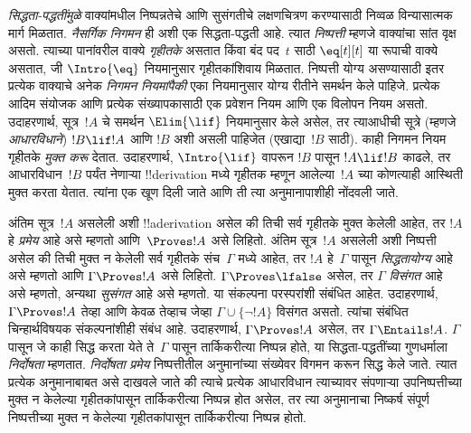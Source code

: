 \emph{सिद्धता-पद्धतींमुळे} वाक्यांमधील निष्पन्नतेचे आणि सुसंगतीचे लक्षणचित्रण करण्यासाठी निव्वळ विन्यासात्मक मार्ग मिळतात. \emph{नैसर्गिक निगमन} ही अशी एक सिद्धता-पद्धती आहे. त्यात \emph{निष्पत्ती} म्हणजे वाक्यांचा सांत वृक्ष असतो. त्याच्या पानांवरील वाक्ये \emph{गृहीतके} असतात किंवा बंद पद~$t$ साठी $\eq[t][t]$ या रूपाची वाक्ये असतात, जी $\Intro{\eq}$ नियमानुसार गृहीतकांशिवाय मिळतात. निष्पत्ती योग्य असण्यासाठी इतर प्रत्येक वाक्याचे अनेक \emph{निगमन नियमांपैकी} एका नियमानुसार योग्य रीतीने समर्थन केले पाहिजे. प्रत्येक आदिम संयोजक आणि प्रत्येक संख्यापकासाठी एक प्रवेशन नियम आणि एक विलोपन नियम असतो. उदाहरणार्थ, सूत्र~$!A$ चे समर्थन $\Elim{\lif}$ नियमानुसार केले असेल, तर त्याआधीची सूत्रे (म्हणजे \emph{आधारविधाने}) $!B \lif !A$ आणि $!B$ अशी असली पाहिजेत (एखाद्या~$!B$ साठी). काही निगमन नियम गृहीतके \emph{मुक्त करू} देतात. उदाहरणार्थ, $\Intro{\lif}$ वापरून $!B$ पासून $!A \lif !B$ काढले, तर आधारविधान~$!B$ पर्यंत नेणाऱ्या !!{derivation} मध्ये गृहीतक म्हणून आलेल्या~$!A$ च्या कोणत्याही आस्थिती मुक्त करता येतात. त्यांना एक खूण दिली जाते आणि ती त्या अनुमानापाशीही नोंदवली जाते.

अंतिम सूत्र~$!A$ असलेली अशी !!a{derivation} असेल की तिची सर्व गृहीतके मुक्त केलेली आहेत, तर $!A$ हे \emph{प्रमेय} आहे असे म्हणतो आणि~$\Proves !A$ असे लिहितो. अंतिम सूत्र~$!A$ असलेली अशी निष्पत्ती असेल की तिची मुक्त न केलेली सर्व गृहीतके संच~$\Gamma$ मध्ये आहेत, तर $!A$ हे~$\Gamma$ पासून \emph{सिद्धतायोग्य} आहे असे म्हणतो आणि $\Gamma \Proves !A$ असे लिहितो. $\Gamma \Proves \lfalse$ असेल, तर $\Gamma$ \emph{विसंगत} आहे असे म्हणतो, अन्यथा \emph{सुसंगत} आहे असे म्हणतो. या संकल्पना परस्परांशी संबंधित आहेत. उदाहरणार्थ, $\Gamma \Proves !A$ तेव्हा आणि केवळ तेव्हाच जेव्हा $\Gamma \cup \{\lnot !A\}$ विसंगत असतो. त्यांचा संबंधित चिन्हार्थविषयक संकल्पनांशीही संबंध आहे. उदाहरणार्थ, $\Gamma \Proves !A$ असेल, तर $\Gamma \Entails !A$. $\Gamma$ पासून जे काही सिद्ध करता येते ते~$\Gamma$ पासून तार्किकरीत्या निष्पन्न होते, या सिद्धता-पद्धतींच्या गुणधर्माला \emph{निर्दोषता} म्हणतात. \emph{निर्दोषता प्रमेय} निष्पत्तीतील अनुमानांच्या संख्येवर विगमन करून सिद्ध केले जाते. त्यात प्रत्येक अनुमानाबाबत असे दाखवले जाते की त्याचे प्रत्येक आधारविधान त्याच्यावर संपणाऱ्या उपनिष्पत्तीच्या मुक्त न केलेल्या गृहीतकांपासून तार्किकरीत्या निष्पन्न होत असेल, तर त्या अनुमानाचा निष्कर्ष संपूर्ण निष्पत्तीच्या मुक्त न केलेल्या गृहीतकांपासून तार्किकरीत्या निष्पन्न होतो.
